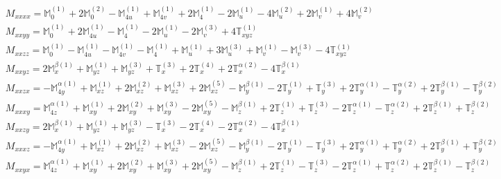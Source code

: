 \documentclass[fleqn,8pt,landscape]{jsarticle}
\begin{document}
\begin{align*}
& M_{xxxx} = \mathbb{M}_{0}^{(1)} + 2 \mathbb{M}_{0}^{(2)} - \mathbb{M}_{4u}^{(1)} + \mathbb{M}_{4v}^{(1)} + 2 \mathbb{M}_{4}^{(1)} - 2 \mathbb{M}_{u}^{(1)} - 4 \mathbb{M}_{u}^{(2)} + 2 \mathbb{M}_{v}^{(1)} + 4 \mathbb{M}_{v}^{(2)} \\
& M_{xxyy} = \mathbb{M}_{0}^{(1)} + 2 \mathbb{M}_{4u}^{(1)} - \mathbb{M}_{4}^{(1)} - 2 \mathbb{M}_{u}^{(1)} - 2 \mathbb{M}_{v}^{(3)} + 4 \mathbb{T}_{xyz}^{(1)} \\
& M_{xxzz} = \mathbb{M}_{0}^{(1)} - \mathbb{M}_{4u}^{(1)} - \mathbb{M}_{4v}^{(1)} - \mathbb{M}_{4}^{(1)} + \mathbb{M}_{u}^{(1)} + 3 \mathbb{M}_{u}^{(3)} + \mathbb{M}_{v}^{(1)} - \mathbb{M}_{v}^{(3)} - 4 \mathbb{T}_{xyz}^{(1)} \\
& M_{xxyz} = 2 \mathbb{M}_{x}^{\beta(1)} + \mathbb{M}_{yz}^{(1)} + \mathbb{M}_{yz}^{(3)} + \mathbb{T}_{x}^{(3)} + 2 \mathbb{T}_{x}^{(4)} + 2 \mathbb{T}_{x}^{\alpha(2)} - 4 \mathbb{T}_{x}^{\beta(1)} \\
& M_{xxzx} = - \mathbb{M}_{4y}^{\alpha(1)} + \mathbb{M}_{xz}^{(1)} + 2 \mathbb{M}_{xz}^{(2)} + \mathbb{M}_{xz}^{(3)} + 2 \mathbb{M}_{xz}^{(5)} - \mathbb{M}_{y}^{\beta(1)} - 2 \mathbb{T}_{y}^{(1)} + \mathbb{T}_{y}^{(3)} + 2 \mathbb{T}_{y}^{\alpha(1)} - \mathbb{T}_{y}^{\alpha(2)} + 2 \mathbb{T}_{y}^{\beta(1)} - \mathbb{T}_{y}^{\beta(2)} \\
& M_{xxxy} = \mathbb{M}_{4z}^{\alpha(1)} + \mathbb{M}_{xy}^{(1)} + 2 \mathbb{M}_{xy}^{(2)} + \mathbb{M}_{xy}^{(3)} - 2 \mathbb{M}_{xy}^{(5)} - \mathbb{M}_{z}^{\beta(1)} + 2 \mathbb{T}_{z}^{(1)} + \mathbb{T}_{z}^{(3)} - 2 \mathbb{T}_{z}^{\alpha(1)} - \mathbb{T}_{z}^{\alpha(2)} + 2 \mathbb{T}_{z}^{\beta(1)} + \mathbb{T}_{z}^{\beta(2)} \\
& M_{xxzy} = 2 \mathbb{M}_{x}^{\beta(1)} + \mathbb{M}_{yz}^{(1)} + \mathbb{M}_{yz}^{(3)} - \mathbb{T}_{x}^{(3)} - 2 \mathbb{T}_{x}^{(4)} - 2 \mathbb{T}_{x}^{\alpha(2)} - 4 \mathbb{T}_{x}^{\beta(1)} \\
& M_{xxxz} = - \mathbb{M}_{4y}^{\alpha(1)} + \mathbb{M}_{xz}^{(1)} + 2 \mathbb{M}_{xz}^{(2)} + \mathbb{M}_{xz}^{(3)} - 2 \mathbb{M}_{xz}^{(5)} - \mathbb{M}_{y}^{\beta(1)} - 2 \mathbb{T}_{y}^{(1)} - \mathbb{T}_{y}^{(3)} + 2 \mathbb{T}_{y}^{\alpha(1)} + \mathbb{T}_{y}^{\alpha(2)} + 2 \mathbb{T}_{y}^{\beta(1)} + \mathbb{T}_{y}^{\beta(2)} \\
& M_{xxyx} = \mathbb{M}_{4z}^{\alpha(1)} + \mathbb{M}_{xy}^{(1)} + 2 \mathbb{M}_{xy}^{(2)} + \mathbb{M}_{xy}^{(3)} + 2 \mathbb{M}_{xy}^{(5)} - \mathbb{M}_{z}^{\beta(1)} + 2 \mathbb{T}_{z}^{(1)} - \mathbb{T}_{z}^{(3)} - 2 \mathbb{T}_{z}^{\alpha(1)} + \mathbb{T}_{z}^{\alpha(2)} + 2 \mathbb{T}_{z}^{\beta(1)} - \mathbb{T}_{z}^{\beta(2)} \\

\end{align*}
\end{document}
